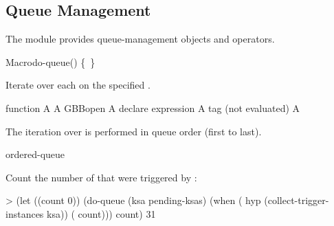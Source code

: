 \documentclass[10pt,twoside,english,pdftex]{article}
\begin{document}

\T\markright{}%
\T\pagestyle{plain}
\T\clearpage
\W{}
\T\pagestyle{fancy}
\T\thispagestyle{fancybottom}
\T\global\def\fnlastname{ }%
\subsection{Queue Management}
\label{sec:queue}%

%
%
The  module provides queue-management objects and operators.

\W\entities
\T\clearpage


\begin{functiondoc}{Macro}{do-queue}{()
    \superstar{} 
    \mbox{\{ \vbar{} \}\superstar}}
%
%

\fnsyntax

\fnpurpose Iterate over each  on the
specified .

\fnpackage {}

\fnmodule {}

\fnargs
\begin{args}{function}
\arg[var] A 
\arg[queue] A GBBopen 
\arg[declaration] A declare expression
\arg[tag] A  tag (not evaluated)
\arg[form] A 
\end{args}

\fndescription The iteration over  is performed
in queue order (first to last).

\begin{alsos}{ordered-queue}
\also[queue]
\end{alsos}

\fnexample
{}%
%
%
Count the number of  that were triggered by
: 
\begin{example}
> (let ((count 0))
    (do-queue (ksa pending-ksas)
      (when ( hyp (collect-trigger-instances ksa))
        ( count)))
     count)
31
\end{example}

\end{functiondoc}
\end{document}
